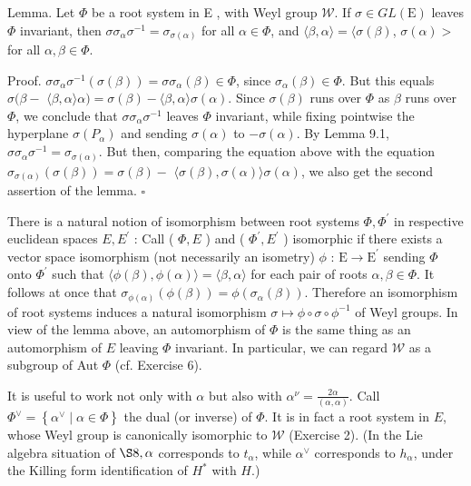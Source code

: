 \documentclass[10pt]{article}
\begin{document}
Lemma. Let $\Phi$ be a root system in E , with Weyl group $\mathscr{W}$. If $\sigma \in G L(\mathrm{E})$ leaves $\Phi$ invariant, then $\sigma \sigma_{\alpha} \sigma^{-1}=\sigma_{\sigma(\alpha)}$ for all $\alpha \in \Phi$, and $\langle\beta, \alpha\rangle=\langle\sigma(\beta)$, $\sigma(\alpha)>$ for all $\alpha, \beta \in \Phi$.

Proof. $\sigma \sigma_{\alpha} \sigma^{-1}(\sigma(\beta))=\sigma \sigma_{\alpha}(\beta) \in \Phi$, since $\sigma_{\alpha}(\beta) \in \Phi$. But this equals $\sigma(\beta-$ $\langle\beta, \alpha\rangle \alpha)=\sigma(\beta)-\langle\beta, \alpha\rangle \sigma(\alpha)$. Since $\sigma(\beta)$ runs over $\Phi$ as $\beta$ runs over $\Phi$, we conclude that $\sigma \sigma_{\alpha} \sigma^{-1}$ leaves $\Phi$ invariant, while fixing pointwise the hyperplane $\sigma\left(P_{\alpha}\right)$ and sending $\sigma(\alpha)$ to $-\sigma(\alpha)$. By Lemma 9.1, $\sigma \sigma_{\alpha} \sigma^{-1}=\sigma_{\sigma(\alpha)}$. But then, comparing the equation above with the equation $\sigma_{\sigma(\alpha)}(\sigma(\beta))=\sigma(\beta)-$ $\langle\sigma(\beta), \sigma(\alpha)\rangle \sigma(\alpha)$, we also get the second assertion of the lemma. $\square$

There is a natural notion of isomorphism between root systems $\Phi, \Phi^{\prime}$ in respective euclidean spaces $E, E^{\prime}$ : Call ( $\Phi, E$ ) and ( $\Phi^{\prime}, E^{\prime}$ ) isomorphic if there exists a vector space isomorphism (not necessarily an isometry) $\phi$ : $\mathrm{E} \rightarrow \mathrm{E}^{\prime}$ sending $\Phi$ onto $\Phi^{\prime}$ such that $\langle\phi(\beta), \phi(\alpha)\rangle=\langle\beta, \alpha\rangle$ for each pair of roots $\alpha, \beta \in \Phi$. It follows at once that $\sigma_{\phi(\alpha)}(\phi(\beta))=\phi\left(\sigma_{\alpha}(\beta)\right)$. Therefore an isomorphism of root systems induces a natural isomorphism $\sigma \mapsto \phi \circ \sigma \circ \phi^{-1}$ of Weyl groups. In view of the lemma above, an automorphism of $\Phi$ is the same thing as an automorphism of $E$ leaving $\Phi$ invariant. In particular, we can regard $\mathscr{W}$ as a subgroup of Aut $\Phi$ (cf. Exercise 6).

It is useful to work not only with $\alpha$ but also with $\alpha^{\nu}=\frac{2 \alpha}{(\alpha, \alpha)}$. Call $\Phi^{\vee}=\left\{\alpha^{\vee} \mid \alpha \in \Phi\right\}$ the dual (or inverse) of $\Phi$. It is in fact a root system in $E$, whose Weyl group is canonically isomorphic to $\mathscr{W}$ (Exercise 2). (In the Lie algebra situation of $\S 8, \alpha$ corresponds to $t_{\alpha}$, while $\alpha^{\vee}$ corresponds to $h_{\alpha}$, under the Killing form identification of $H^{*}$ with $H$.)
\end{document}

